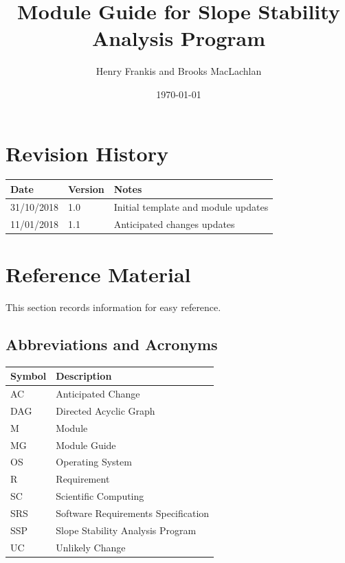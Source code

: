 \documentclass[12pt, titlepage]{article}
\newcommand{\progname}{SSP}
\begin{document}
\title{Module Guide for Slope Stability Analysis Program} 
\author{Henry Frankis and Brooks MacLachlan}
\date{\today}

\maketitle


\section{Revision History}

\begin{tabularx}{\textwidth}{p{3cm}p{2cm}X}
	\toprule {\bf Date} & {\bf Version} & {\bf Notes}\\
	\midrule
	31/10/2018 & 1.0 & Initial template and module updates\\
	11/01/2018 & 1.1 & Anticipated changes updates\\
	\bottomrule
\end{tabularx}

\newpage

\section{Reference Material}
This section records information for easy reference.
\subsection{Abbreviations and Acronyms}

\renewcommand{\arraystretch}{1.2}
\begin{tabular}{l l} 
	\toprule		
	\textbf{Symbol} & \textbf{Description}\\
	\midrule 
	AC & Anticipated Change\\
	DAG & Directed Acyclic Graph \\
	M & Module \\
	MG & Module Guide \\
	OS & Operating System \\
	R & Requirement\\
	SC & Scientific Computing \\
	SRS & Software Requirements Specification\\
	\progname & Slope Stability Analysis Program\\
	UC & Unlikely Change \\
	\bottomrule
\end{tabular}\\
\end{document}
